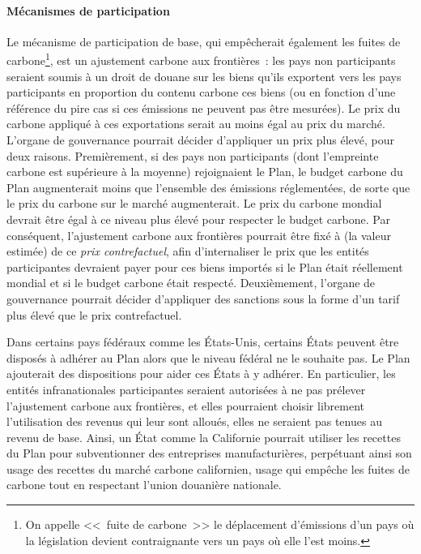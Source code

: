 \documentclass[a5paper,french]{memoir}
\begin{document}
\paragraph{Mécanismes de participation}

Le mécanisme de participation de base, qui empêcherait également les fuites de carbone\footnote{On appelle <<~fuite de carbone~>> le déplacement d'émissions d'un pays où la législation devient contraignante vers un pays où elle l'est moins.}, est un ajustement carbone aux frontières~: les pays non participants seraient soumis à un droit de douane sur les biens qu'ils exportent vers les pays participants en proportion du contenu carbone ces biens (ou en fonction d'une référence du pire cas si ces émissions ne peuvent pas être mesurées). Le prix du carbone appliqué à ces exportations serait au moins égal au prix du marché. L'organe de gouvernance pourrait décider d'appliquer un prix plus élevé, pour deux raisons. Premièrement, si des pays non participants (dont l'empreinte carbone est supérieure à la moyenne) rejoignaient le Plan, le budget carbone du Plan augmenterait moins que l'ensemble des émissions réglementées, de sorte que le prix du carbone sur le marché augmenterait. Le prix du carbone mondial devrait être égal à ce niveau plus élevé pour respecter le budget carbone. Par conséquent, l'ajustement carbone aux frontières pourrait être fixé à (la valeur estimée) de ce \textit{prix contrefactuel}, afin d'internaliser le prix que les entités participantes devraient payer pour ces biens importés si le Plan était réellement mondial et si le budget carbone était respecté. Deuxièmement, l'organe de gouvernance pourrait décider d'appliquer des sanctions sous la forme d'un tarif plus élevé que le prix contrefactuel. 

Dans certains pays fédéraux comme les États-Unis, certains États peuvent être disposés à adhérer au Plan alors que le niveau fédéral ne le souhaite pas. Le Plan ajouterait des dispositions pour aider ces États à y adhérer. En particulier, les entités infranationales participantes seraient autorisées à ne pas prélever l'ajustement carbone aux frontières, et elles pourraient choisir librement l'utilisation des revenus qui leur sont alloués, elles ne seraient pas tenues au revenu de base. 
Ainsi, un État comme la Californie pourrait utiliser les recettes du Plan pour subventionner des entreprises manufacturières, perpétuant ainsi son usage des recettes du marché carbone californien, usage qui empêche les fuites de carbone tout en respectant l'union douanière nationale.
\end{document}
